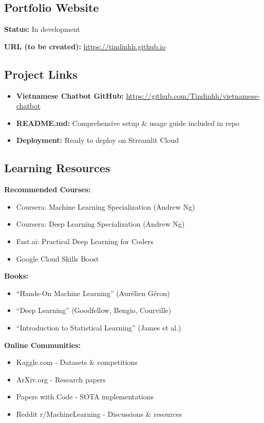 \documentclass[12pt,a4paper]{article}
\begin{document}
\subsection{Portfolio Website}

\textbf{Status:} In development

\textbf{URL (to be created):} \url{https://tindinhh.github.io}

\subsection{Project Links}

\begin{itemize}
    \item \textbf{Vietnamese Chatbot GitHub:} \url{https://github.com/Tindinhh/vietnamese-chatbot}
    \item \textbf{README.md:} Comprehensive setup \& usage guide included in repo
    \item \textbf{Deployment:} Ready to deploy on Streamlit Cloud
\end{itemize}

\subsection{Learning Resources}

\textbf{Recommended Courses:}
\begin{itemize}
    \item Coursera: Machine Learning Specialization (Andrew Ng)
    \item Coursera: Deep Learning Specialization (Andrew Ng)
    \item Fast.ai: Practical Deep Learning for Coders
    \item Google Cloud Skills Boost
\end{itemize}

\textbf{Books:}
\begin{itemize}
    \item ``Hands-On Machine Learning'' (Aurélien Géron)
    \item ``Deep Learning'' (Goodfellow, Bengio, Courville)
    \item ``Introduction to Statistical Learning'' (James et al.)
\end{itemize}

\textbf{Online Communities:}
\begin{itemize}
    \item Kaggle.com - Datasets \& competitions
    \item ArXiv.org - Research papers
    \item Papers with Code - SOTA implementations
    \item Reddit r/MachineLearning - Discussions \& resources
\end{itemize}

\end{document}
